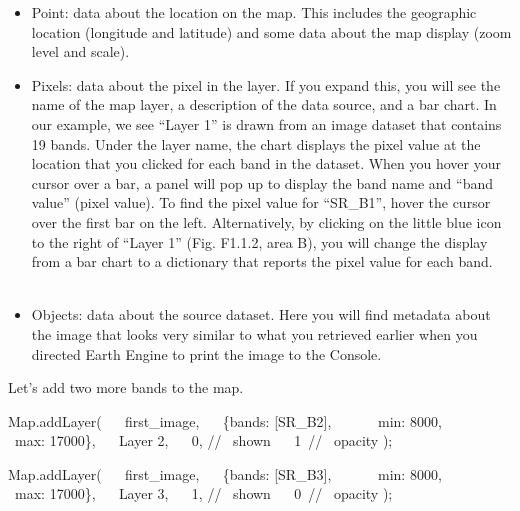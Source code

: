 \documentclass[
  letterpaper,
  DIV=11,
  numbers=noendperiod]{scrreprt}
\newenvironment{Shaded}{\begin{snugshade}}{\end{snugshade}}
\newcommand{\BuiltInTok}[1]{\textcolor[rgb]{0.00,0.23,0.31}{#1}}
\newcommand{\CommentTok}[1]{\textcolor[rgb]{0.37,0.37,0.37}{#1}}
\newcommand{\DataTypeTok}[1]{\textcolor[rgb]{0.68,0.00,0.00}{#1}}
\newcommand{\DecValTok}[1]{\textcolor[rgb]{0.68,0.00,0.00}{#1}}
\newcommand{\ErrorTok}[1]{\textcolor[rgb]{0.68,0.00,0.00}{#1}}
\newcommand{\FunctionTok}[1]{\textcolor[rgb]{0.28,0.35,0.67}{#1}}
\newcommand{\NormalTok}[1]{\textcolor[rgb]{0.00,0.23,0.31}{#1}}
\newcommand{\OperatorTok}[1]{\textcolor[rgb]{0.37,0.37,0.37}{#1}}
\newcommand{\StringTok}[1]{\textcolor[rgb]{0.13,0.47,0.30}{#1}}
\begin{document}
\begin{itemize}
\item
  Point: data about the location on the map. This includes the
  geographic location (longitude and latitude) and some data about the
  map display (zoom level and scale).
\item
  Pixels: data about the pixel in the layer. If you expand this, you
  will see the name of the map layer, a description of the data source,
  and a bar chart. In our example, we see ``Layer 1'' is drawn from an
  image dataset that contains 19 bands. Under the layer name, the chart
  displays the pixel value at the location that you clicked for each
  band in the dataset. When you hover your cursor over a bar, a panel
  will pop up to display the band name and ``band value'' (pixel value).
  To find the pixel value for ``SR\_B1'', hover the cursor over the
  first bar on the left. Alternatively, by clicking on the little blue
  icon to the right of ``Layer 1'' (Fig. F1.1.2, area B), you will
  change the display from a bar chart to a dictionary that reports the
  pixel value for each band. ~ ~
\item
  Objects: data about the source dataset. Here you will find metadata
  about the image that looks very similar to what you retrieved earlier
  when you directed Earth Engine to print the image to the Console. ~
\end{itemize}

Let's add two more bands to the map.

\begin{Shaded}
\begin{Highlighting}[]
\BuiltInTok{Map}\OperatorTok{.}\FunctionTok{addLayer}\NormalTok{(  }
\NormalTok{   first\_image}\OperatorTok{,}  
\NormalTok{   \{}\DataTypeTok{bands}\OperatorTok{:}\NormalTok{ [}\StringTok{\textquotesingle{}SR\_B2\textquotesingle{}}\NormalTok{]}\OperatorTok{,}  
      \DataTypeTok{ min}\OperatorTok{:} \DecValTok{8000}\OperatorTok{,}  
      \DataTypeTok{ max}\OperatorTok{:} \DecValTok{17000}\NormalTok{\}}\OperatorTok{,}   
    \StringTok{\textquotesingle{}Layer 2\textquotesingle{}}\OperatorTok{,}   
    \DecValTok{0}\OperatorTok{,} \CommentTok{//  shown   }
    \DecValTok{1}\ErrorTok{ }\CommentTok{//  opacity  }
\NormalTok{)}\OperatorTok{;}  
  
\BuiltInTok{Map}\OperatorTok{.}\FunctionTok{addLayer}\NormalTok{(  }
\NormalTok{   first\_image}\OperatorTok{,}  
\NormalTok{   \{}\DataTypeTok{bands}\OperatorTok{:}\NormalTok{ [}\StringTok{\textquotesingle{}SR\_B3\textquotesingle{}}\NormalTok{]}\OperatorTok{,}  
      \DataTypeTok{ min}\OperatorTok{:} \DecValTok{8000}\OperatorTok{,}  
      \DataTypeTok{ max}\OperatorTok{:} \DecValTok{17000}\NormalTok{\}}\OperatorTok{,}   
    \StringTok{\textquotesingle{}Layer 3\textquotesingle{}}\OperatorTok{,}   
    \DecValTok{1}\OperatorTok{,} \CommentTok{//  shown   }
    \DecValTok{0}\ErrorTok{ }\CommentTok{//  opacity  }
\NormalTok{)}\OperatorTok{;}
\end{Highlighting}
\end{Shaded}
\end{document}

